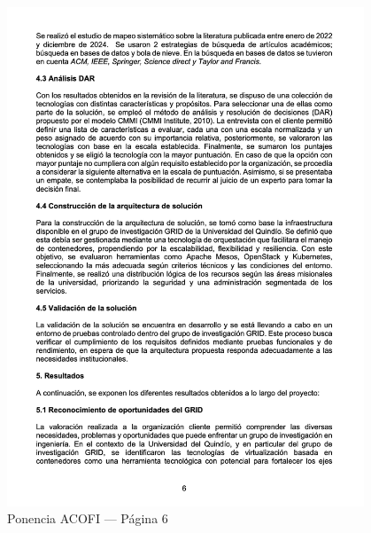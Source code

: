 \begin{figure}[H]
	\centering
	\begin{tcolorbox}[
			colback=white,
			colframe=gray!50,
			boxrule=1pt,
			arc=2pt,
			boxsep=5pt,
			left=3pt,
			right=3pt,
			top=3pt,
			bottom=3pt,
			drop shadow
		]
		\includegraphics[width=0.95\textwidth,keepaspectratio]{apendices/ACOFI/pagina_6.png}
	\end{tcolorbox}
	\caption{Ponencia ACOFI --- Página 6}\label{fig:acofi-pagina-6}
\end{figure}
\FloatBarrier%
